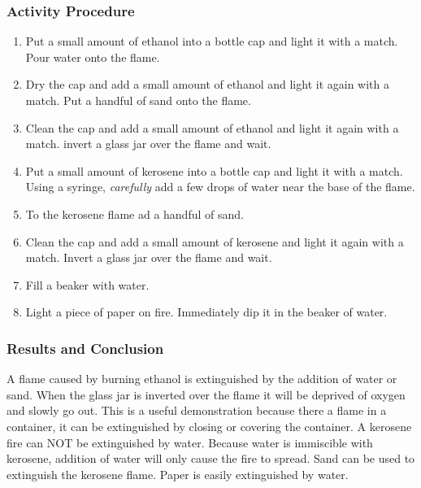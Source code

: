 \subsubsection*{Activity Procedure}
\begin{enumerate}
\item{Put a small amount of ethanol into a bottle cap and light it with a match. Pour water onto the flame.}
\item{Dry the cap and add a small amount of ethanol and light it again with a match. Put a handful of sand onto the flame.}
\item{Clean the cap and add a small amount of ethanol and light it again with a match. invert a glass jar over the flame and wait.}
\item{Put a small amount of kerosene into a bottle cap and light it with a match. Using a syringe, \textit{carefully} add a few drops of water near the base of the flame.}
\item{To the kerosene flame ad a handful of sand.}
\item{Clean the cap and add a small amount of kerosene and light it again with a match. Invert a glass jar over the flame and wait.}
\item{Fill a beaker with water.}
\item{Light a piece of paper on fire. Immediately dip it in the beaker of water.}
\end{enumerate}

\subsubsection*{Results and Conclusion}
A flame caused by burning ethanol is extinguished by the addition of water or sand. When the glass jar is inverted over the flame it will be deprived of oxygen and slowly go out. This is a useful demonstration because there a flame in a container, it can be extinguished by closing or covering the container.
A kerosene fire can NOT be extinguished by water. Because water is immiscible with kerosene, addition of water will only cause the fire to spread. Sand can be used to extinguish the kerosene flame.
Paper is easily extinguished by water.
